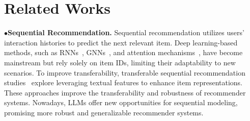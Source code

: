 \vspace{-4mm}
\section{Related Works}
\noindent$\bullet$\quad\textbf{Sequential Recommendation.}
Sequential recommendation utilizes users' interaction histories to predict the next relevant item. Deep learning-based methods, such as RNNs~\cite{DBLP:journals/corr/HidasiKBT15,RNN2}, GNNs~\cite{graph_1,graph_2}, and attention mechanisms~\cite{kang2018self,S3-Rec,CL4SRec}, have become mainstream but rely solely on item IDs, limiting their adaptability to new scenarios. To improve transferability, transferable sequential recommendation studies~\cite{hou2022towards,10.1145/3543507.3583434,10.1145/3580305.3599519,MoRec} explore leveraging textual features to enhance item representations. These approaches improve the transferability and robustness of recommender systems.
Nowadays, LLMs offer new opportunities for sequential modeling, promising more robust and generalizable recommender systems.


